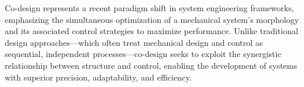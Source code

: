 Co-design represents a recent paradigm shift in system engineering
frameworks, emphasizing the simultaneous optimization of a mechanical
system's morphology and its associated control strategies to maximize
performance. Unlike traditional design approaches---which often treat
mechanical design and control as sequential, independent
processes---co-design seeks to exploit the synergistic relationship
between structure and control, enabling the development of systems with
superior precision, adaptability, and efficiency.
